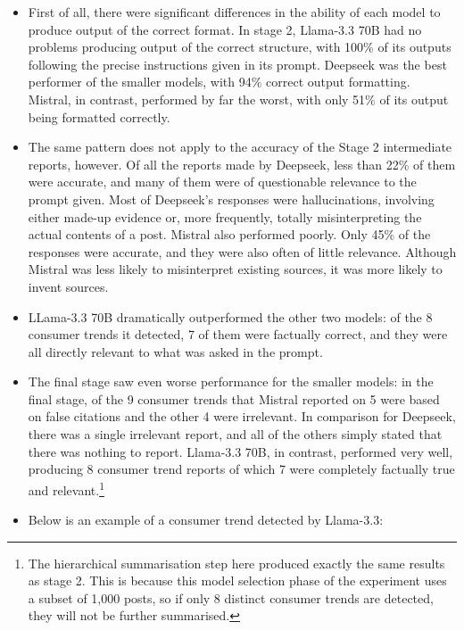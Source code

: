 \documentclass{report}
\begin{document}
\begin{itemize}
\item First of all, there were significant differences in the ability of each model to produce output of the correct format. In stage 2, Llama-3.3 70B had no problems producing output of the correct structure, with 100\% of its outputs following the precise instructions given in its prompt. Deepseek was the best performer of the smaller models, with 94\% correct output formatting. Mistral, in contrast, performed by far the worst, with only 51\% of its output being formatted correctly.

\item The same pattern does not apply to the accuracy of the Stage 2 intermediate reports, however. Of all the reports made by Deepseek, less than 22\% of them were accurate, and many of them were of questionable relevance to the prompt given. Most of Deepseek's responses were hallucinations, involving either made-up evidence or, more frequently, totally misinterpreting the actual contents of a post. Mistral also performed poorly. Only 45\% of the responses were accurate, and they were also often of little relevance. Although Mistral was less likely to misinterpret existing sources, it was more likely to invent sources.

\item LLama-3.3 70B dramatically outperformed the other two models: of the 8 consumer trends it detected, 7 of them were factually correct, and they were all directly relevant to what was asked in the prompt.

\item The final stage saw even worse performance for the smaller models: in the final stage, of the 9 consumer trends that Mistral reported on 5 were based on false citations and the other 4 were irrelevant. In comparison for Deepseek, there was a single irrelevant report, and all of the others simply stated that there was nothing to report. Llama-3.3 70B, in contrast, performed very well, producing 8 consumer trend reports of which 7 were completely factually true and relevant.\footnote{The hierarchical summarisation step here produced exactly the same results as stage 2. This is because this model selection phase of the experiment uses a subset of 1,000 posts, so if only 8 distinct consumer trends are detected, they will not be further summarised.}

\item Below is an example of a consumer trend detected by Llama-3.3:


\end{itemize}
\end{document}
